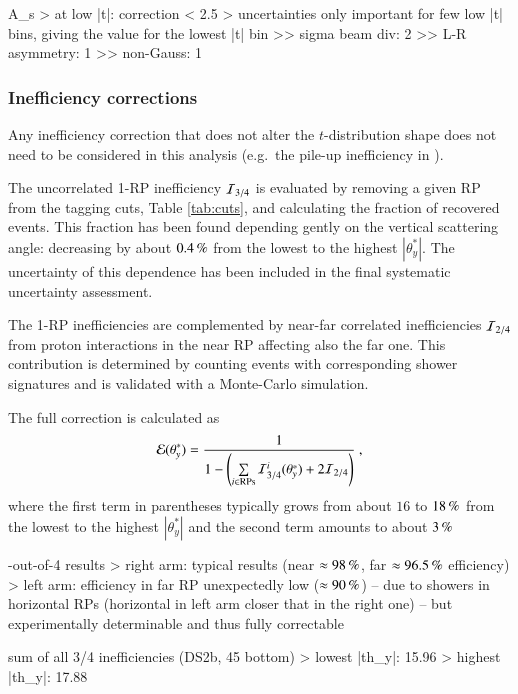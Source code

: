 \> A_s
\>> at low |t|: correction < 2.5
\>> uncertainties only important for few low |t| bins, giving the value for the lowest |t| bin
\>>> sigma beam div: 2%
\>>> L-R asymmetry: 1%
\>>> non-Gauss: 1%
\fi



\subsubsection{Inefficiency corrections}

Any inefficiency correction that does not alter the $t$-distribution shape does not need to be considered in this analysis (e.g.~the pile-up inefficiency in \cite{prl111}).

The uncorrelated 1-RP inefficiency ${\cal I}_{3/4}$ is evaluated by removing a given RP from the tagging cuts, Table \ref{tab:cuts}, and calculating the fraction of recovered events. This fraction has been found depending gently on the vertical scattering angle: decreasing by about $0.4\,{\rm \%}$ from the lowest to the highest $|\theta_y^*|$. The uncertainty of this dependence has been included in the final systematic uncertainty assessment.

The 1-RP inefficiencies are complemented by near-far correlated inefficiencies ${\cal I}_{2/4}$ from proton interactions in the near RP affecting also the far one. This contribution is determined by counting events with corresponding shower signatures and is validated with a Monte-Carlo simulation.

The full correction is calculated as
\begin{equation}
\label{efficiency}
	{\cal E}(\theta_y^*) = {1\over 1 - \left( \sum\limits_{i\in \rm RPs} {\cal I}^i_{3/4}(\theta_y^*) + 2 {\cal I}_{2/4} \right) } \ ,
\end{equation}
where the first term in parentheses typically grows from about $16$ to $18\,{\rm \%}$ from the lowest to the highest $|\theta_y^*|$ and the second term amounts to about $3\,{\rm \%}$

\iffalse
{}-out-of-4 results
\>> right arm: typical results (near $\approx 98\,{\rm \%}$, far $\approx 96.5\,{\rm \%}$ efficiency)
\>> left arm: efficiency in far RP unexpectedly low ($\approx 90\,{\rm \%}$) -- due to showers in horizontal RPs (horizontal in left arm closer that in the right one) -- but experimentally determinable and thus fully correctable

\> sum of all 3/4 inefficiencies (DS2b, 45 bottom)
\>> lowest |th_y|: 15.96%
\>> highest |th_y|: 17.88%


